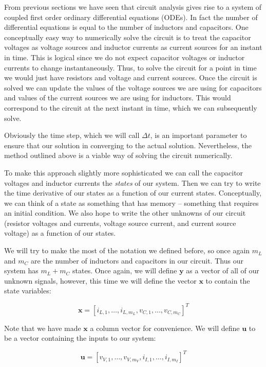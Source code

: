 \documentclass[14pt,a5paper,twoside]{book}
\begin{document}
From previous sections we have seen that circuit analysis gives rise to a system of coupled first order ordinary differential equations (ODEs). In fact the number of differential equations is equal to the number of inductors and capacitors. One conceptually easy way to numerically solve the circuit is to treat the capacitor voltages as voltage sources and inductor currents as current sources for an instant in time. This is logical since we do not expect capacitor voltages or inductor currents to change instantaneously. Thus, to solve the circuit for a point in time we would just have resistors and voltage and current sources. Once the circuit is solved we can update the values of the voltage sources we are using for capacitors and values of the current sources we are using for inductors. This would correspond to the circuit at the next instant in time, which we can subsequently solve.

Obviously the time step, which we will call $\Delta t$, is an important parameter to ensure that our solution in converging to the actual solution. Nevertheless, the method outlined above is a viable way of solving the circuit numerically.

To make this approach slightly more sophisticated we can call the capacitor voltages and inductor currents the \emph{states} of our system. Then we can try to write the time derivative of our states as a function of our current states. Conceptually, we can think of a state as something that has memory -- something that requires an initial condition. We also hope to write the other unknowns of our circuit (resistor voltages and currents, voltage source current, and current source voltage) as a function of our states.

We will try to make the most of the notation we defined before, so once again $m_L$ and $m_C$ are the number of inductors and capacitors in our circuit. Thus our system has $m_L + m_C$ states. Once again, we will define $\mathbf{y}$ as a vector of all of our unknown signals, however, this time we will define the vector $\mathbf{x}$ to contain the state variables:

$$
\mathbf{x} = [i_{L,1}, \ldots, i_{L,m_L}, v_{C,1}, \ldots, v_{C,m_C}]^T
$$

Note that we have made $\mathbf{x}$ a column vector for convenience. We will define $\mathbf{u}$ to be a vector containing the inputs to our system:

$$
\mathbf{u} = [v_{V,1}, \ldots ,v_{V,m_V}, i_{I,1}, \ldots ,i_{I,m_I}]^T
$$ 
\end{document}
